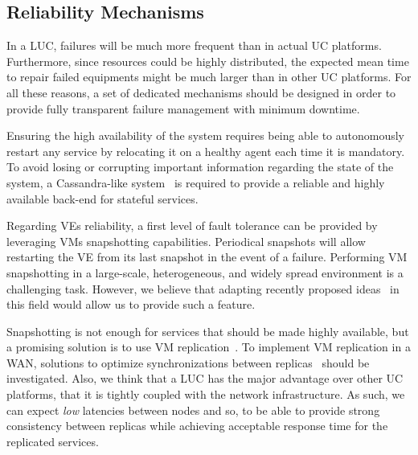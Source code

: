 \subsection{Reliability Mechanisms}
In a LUC, failures will be much more frequent than in actual UC
platforms. Furthermore, since resources could be highly distributed,
the expected mean time to repair failed equipments might be much
larger than in other UC platforms. For all these reasons, a set of
dedicated mechanisms should be designed in order to provide fully
transparent failure management with minimum downtime. 


Ensuring the high availability of the \discovery system requires being able to
autonomously restart any service by relocating it on a healthy agent each time
it is mandatory. To avoid losing or corrupting important information regarding
the state of the system, a Cassandra-like system~\cite{lakshman:2010} is
required to provide a reliable and highly available back-end for stateful
services.

Regarding VEs reliability, a first level of fault tolerance can be
provided by leveraging VMs snapshotting capabilities. Periodical
snapshots will allow restarting the VE from its last snapshot in the
event of a failure. Performing VM snapshotting in a large-scale,
heterogeneous, and widely spread environment is a challenging
task. However, we believe that adapting recently proposed
ideas~\cite{nicolae:2011} in this field would allow us to provide such
a feature.

Snapshotting is not enough for services that should be made highly
available, but a promising solution is to use VM
replication~\cite{Petrovic2012}. To implement VM replication in a WAN,
solutions to optimize synchronizations between
replicas~\cite{gerofi:2012,rajagopalan:2012} should be
investigated. Also, we think that a LUC has the major advantage over
other UC platforms, that it is tightly coupled with the network
infrastructure. As such, we can expect \emph{low} latencies between
nodes and so, to be able to provide strong consistency between
replicas while achieving acceptable response time for the replicated
services. 


